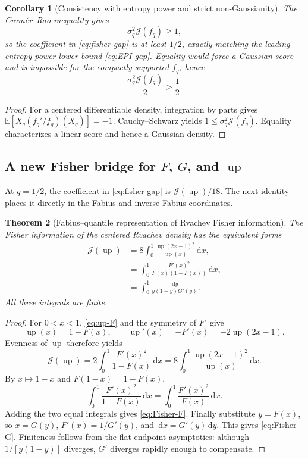 \documentclass[11pt,oneside]{article}
\newtheorem{theorem}{Theorem}[section]
\newtheorem{corollary}[theorem]{Corollary}
\theoremstyle{definition}
\theoremstyle{remark}
\newcommand{\E}{\mathbb E}
\newcommand{\Up}{\operatorname{up}}
\newcommand{\dd}{\,\mathrm d}
\begin{document}
\begin{corollary}[Consistency with entropy power and strict non-Gaussianity]
\label{cor:CR-coefficient}
The Cram\'er--Rao inequality gives
\begin{equation}
 \sigma_q^2\mathcal J(f_q)\ge1,
 \label{eq:CR}
\end{equation}
so the coefficient in \eqref{eq:fisher-gap} is at least $1/2$, exactly matching
the leading entropy-power lower bound \eqref{eq:EPI-gap}.  Equality would force a
Gaussian score and is impossible for the compactly supported $f_q$; hence
\begin{equation}
 \frac{\sigma_q^2\mathcal J(f_q)}2>\frac12.
 \label{eq:strict-coefficient}
\end{equation}
\end{corollary}

\begin{proof}
For a centered differentiable density, integration by parts gives
$\E[X_q(f_q'/f_q)(X_q)]=-1$.  Cauchy--Schwarz yields
$1\le\sigma_q^2\mathcal J(f_q)$.  Equality characterizes a linear score and hence
a Gaussian density.
\end{proof}

\subsection{A new Fisher bridge for $F$, $G$, and $\Up$}

At $q=1/2$, the coefficient in \eqref{eq:fisher-gap} is
$\mathcal J(\Up)/18$.  The next identity places it directly in the Fabius and
inverse-Fabius coordinates.

\begin{theorem}[Fabius--quantile representation of Rvachev Fisher information]
\label{thm:Fisher-bridge}
The Fisher information of the centered Rvachev density has the equivalent forms
\begin{align}
 \mathcal J(\Up)
 &=8\int_0^1\frac{\Up(2x-1)^2}{\Up(x)}\dd x,
 \label{eq:Fisher-up-dilation}\\
 &=\int_0^1\frac{F'(x)^2}{F(x)(1-F(x))}\dd x,
 \label{eq:Fisher-F}\\
 &=\int_0^1\frac{\dd y}{y(1-y)G'(y)}.
 \label{eq:Fisher-G}
\end{align}
All three integrals are finite.
\end{theorem}

\begin{proof}
For $0<x<1$, \eqref{eq:up-F} and the symmetry of $F'$ give
\[
 \Up(x)=1-F(x),
 \qquad
 \Up'(x)=-F'(x)=-2\Up(2x-1).
\]
Evenness of $\Up$ therefore yields
\[
 \mathcal J(\Up)
 =2\int_0^1\frac{F'(x)^2}{1-F(x)}\dd x
 =8\int_0^1\frac{\Up(2x-1)^2}{\Up(x)}\dd x.
\]
By $x\mapsto1-x$ and $F(1-x)=1-F(x)$,
\[
 \int_0^1\frac{F'(x)^2}{1-F(x)}\dd x
 =\int_0^1\frac{F'(x)^2}{F(x)}\dd x.
\]
Adding the two equal integrals gives \eqref{eq:Fisher-F}.  Finally substitute
$y=F(x)$, so $x=G(y)$, $F'(x)=1/G'(y)$, and
$\dd x=G'(y)\dd y$.  This gives \eqref{eq:Fisher-G}.  Finiteness follows from the
flat endpoint asymptotics: although $1/[y(1-y)]$ diverges, $G'$ diverges rapidly
enough to compensate.
\end{proof}
\end{document}
